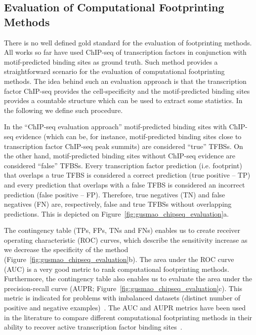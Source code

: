 \subsection{Evaluation of Computational Footprinting Methods}
\label{sec:evaluation.computational.footprinting.methods}

There is no well defined gold standard for the evaluation of footprinting methods. All works so far have used ChIP-seq of transcription factors in conjunction with motif-predicted binding sites as ground truth. Such method provides a straightforward scenario for the evaluation of computational footprinting methods. The idea behind such an evaluation approach is that the transcription factor ChIP-seq provides the cell-specificity and the motif-predicted binding sites provides a countable structure which can be used to extract some statistics. In the following we define such procedure.

In the ``ChIP-seq evaluation approach'' motif-predicted binding sites with ChIP-seq evidence (which can be, for instance, motif-predicted binding sites close to transcription factor ChIP-seq peak summits) are considered ``true'' TFBSs. On the other hand, motif-predicted binding sites without ChIP-seq evidence are considered ``false'' TFBSs. Every transcription factor prediction (i.e. footprint) that overlaps a true TFBS is considered a correct prediction (true positive -- TP) and every prediction that overlaps with a false TFBS is considered an incorrect prediction (false positive -- FP). Therefore, true negatives (TN) and false negatives (FN) are, respectively, false and true TFBSs without overlapping predictions. This is depicted on Figure~\ref{fig:gusmao_chipseq_evaluation}a.

The contingency table (TPs, FPs, TNs and FNs) enables us to create receiver operating characteristic (ROC) curves, which describe the sensitivity increase as we decrease the specificity of the method (Figure~\ref{fig:gusmao_chipseq_evaluation}b). The area under the ROC curve (AUC) is a very good metric to rank computational footprinting methods. Furthermore, the contingency table also enables us to evaluate the area under the precision-recall curve (AUPR; Figure~\ref{fig:gusmao_chipseq_evaluation}c). This metric is indicated for problems with imbalanced datasets (distinct number of positive and negative examples)~\cite{davis2006,fawcett2006}. The AUC and AUPR metrics have been used in the literature to compare different computational footprinting methods in their ability to recover active transcription factor binding sites~\cite{pique2011,cuellar2012}.

